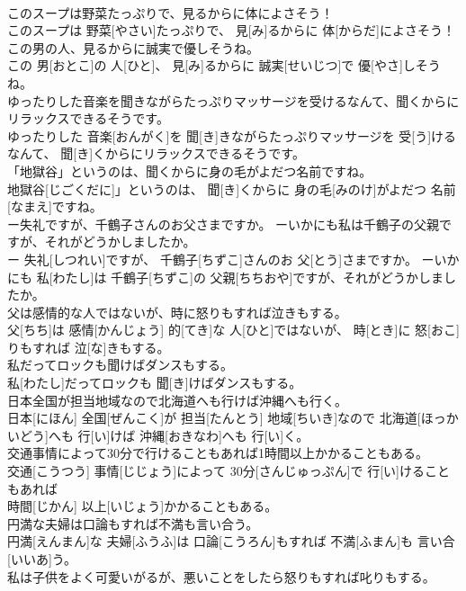 \documentclass[8pt]{extreport}
\begin{document}
\begin{CJK}{UTF8}{min}
\\	このスープは野菜たっぷりで、見るからに体によさそう！	
\\	このスープは 野菜[やさい]たっぷりで、 見[み]るからに 体[からだ]によさそう！
\\	この男の人、見るからに誠実で優しそうね。	
\\	この 男[おとこ]の 人[ひと]、 見[み]るからに 誠実[せいじつ]で 優[やさ]しそうね。
\\	ゆったりした音楽を聞きながらたっぷりマッサージを受けるなんて、聞くからにリラックスできるそうです。	
\\	ゆったりした 音楽[おんがく]を 聞[き]きながらたっぷりマッサージを 受[う]けるなんて、 聞[き]くからにリラックスできるそうです。
\\	「地獄谷」というのは、聞くからに身の毛がよだつ名前ですね。	
\\	地獄谷[じごくだに]」というのは、 聞[き]くからに 身の毛[みのけ]がよだつ 名前[なまえ]ですね。
\\	ー失礼ですが、千鶴子さんのお父さまですか。 ーいかにも私は千鶴子の父親ですが、それがどうかしましたか。	
\\	ー 失礼[しつれい]ですが、 千鶴子[ちずこ]さんのお 父[とう]さまですか。 ーいかにも 私[わたし]は 千鶴子[ちずこ]の 父親[ちちおや]ですが、それがどうかしましたか。
\\	父は感情的な人ではないが、時に怒りもすれば泣きもする。	
\\	父[ちち]は 感情[かんじょう] 的[てき]な 人[ひと]ではないが、 時[とき]に 怒[おこ]りもすれば 泣[な]きもする。
\\	私だってロックも聞けばダンスもする。	
\\	私[わたし]だってロックも 聞[き]けばダンスもする。
\\	日本全国が担当地域なので北海道へも行けば沖縄へも行く。	
\\	日本[にほん] 全国[ぜんこく]が 担当[たんとう] 地域[ちいき]なので 北海道[ほっかいどう]へも 行[い]けば 沖縄[おきなわ]へも 行[い]く。
\\	交通事情によって30分で行けることもあれば1時間以上かかることもある。	
\\	交通[こうつう] 事情[じじょう]によって 30分[さんじゅっぷん]で 行[い]けることもあれば 
\\	時間[じかん] 以上[いじょう]かかることもある。
\\	円満な夫婦は口論もすれば不満も言い合う。	
\\	円満[えんまん]な 夫婦[ふうふ]は 口論[こうろん]もすれば 不満[ふまん]も 言い合[いいあ]う。
\\	私は子供をよく可愛いがるが、悪いことをしたら怒りもすれば叱りもする。	

\end{CJK}
\end{document}
